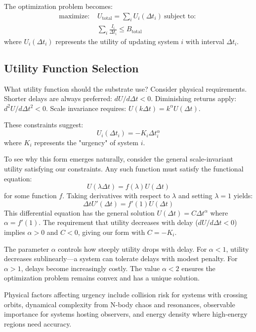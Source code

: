 \documentclass[usenatbib]{mnras}
\begin{document}
The optimization problem becomes:
\begin{align}
\text{maximize: } & U_{\text{total}} = \sum_i U_i(\Delta t_i) \
\text{subject to: }\\ & \sum_i \frac{I_i}{\Delta t_i} \leq B_{\text{total}}
\end{align}
where $U_i(\Delta t_i)$ represents the utility of updating system $i$ with interval $\Delta t_i$.

\subsection{Utility Function Selection}

What utility function should the substrate use? Consider physical requirements. Shorter delays are always preferred: $dU/d\Delta t < 0$. Diminishing returns apply: $d^2U/d\Delta t^2 < 0$. Scale invariance requires: $U(k\Delta t) = k^\alpha U(\Delta t)$.

These constraints suggest:
\begin{equation}
U_i(\Delta t_i) = -K_i \Delta t_i^\alpha
\end{equation}
where $K_i$ represents the "urgency" of system $i$.

To see why this form emerges naturally, consider the general scale-invariant utility satisfying our constraints. Any such function must satisfy the functional equation:
\begin{equation}
U(\lambda \Delta t) = f(\lambda) U(\Delta t)
\end{equation}
for some function $f$. Taking derivatives with respect to $\lambda$ and setting $\lambda = 1$ yields:
\begin{equation}
\Delta t U'(\Delta t) = f'(1) U(\Delta t)
\end{equation}
This differential equation has the general solution $U(\Delta t) = C \Delta t^{\alpha}$ where $\alpha = f'(1)$. The requirement that utility decreases with delay ($dU/d\Delta t < 0$) implies $\alpha > 0$ and $C < 0$, giving our form with $C = -K_i$.

The parameter $\alpha$ controls how steeply utility drops with delay. For $\alpha < 1$, utility decreases sublinearly---a system can tolerate delays with modest penalty. For $\alpha > 1$, delays become increasingly costly. The value $\alpha < 2$ ensures the optimization problem remains convex and has a unique solution.

Physical factors affecting urgency include collision risk for systems with crossing orbits, dynamical complexity from N-body chaos and resonances, observable importance for systems hosting observers, and energy density where high-energy regions need accuracy.
\end{document}
